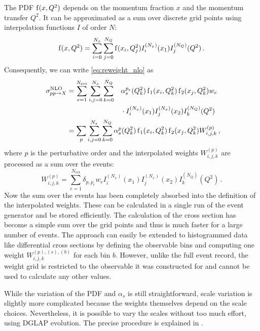 The PDF $\operatorname{f}(x,Q^2)$ depends on the momentum fraction $x$ and the momentum transfer $Q^2$.
It can be approximated as a sum over discrete grid points using interpolation functions $I$ of order $N$:
%
\begin{equation}
	\operatorname{f}(x,Q^2) = \sum_{i=0}^{N_x} \sum_{j=0}^{N_Q} \operatorname{f}(x_i,Q_j^2) I_i^{(N_x)}(x_1) I_j^{(N_Q)}(Q^2) \, .
\end{equation}
%
Consequently, we can write \cref{eq:reweight_nlo} as
%
\begin{alignat}{3}
  \sigma^\text{NLO}_{pp \rightarrow X}	&= \sum_{e=1}^{N_\text{evt}} \sum_{i,j=0}^{N_x} \sum_{k=0}^{N_Q} &&\alpha_s^{p_e}(Q_k^2) \pdf_1(x_i,Q_k^2) \pdf_2(x_j,Q_k^2) w_e \nonumber \\
  										&	&&\cdot I_i^{(N_x)}(x_1) I_j^{(N_x)}(x_2) I_k^{(N_Q)}(Q^2) \nonumber \\
  										&= \mathrlap{\sum_p \sum_{i,j=0}^{N_x} \sum_{k=0}^{N_Q} \alpha_s^p(Q_k^2) \pdf_1(x_i,Q_k^2) \pdf_2(x_j,Q_k^2) W_{i,j,k}^{(p)} \, ,}
\end{alignat}
%
where $p$ is the perturbative order and the interpolated weights $W_{i,j,k}^{(p)}$ are processed as a sum over the events:
\begin{equation}
	W_{i,j,k}^{(p)} = \sum_{e=1}^{N_\text{evt}} \delta_{p,p_e} w_e I_i^{(N_x)}(x_1) I_j^{(N_x)}(x_2) I_k^{(N_Q)}(Q^2) \, .
\end{equation}
%
Now the sum over the events has been completely absorbed into the definition of the interpolated weights.
These can be calculated in a single run of the event generator and be stored efficiently.
The calculation of the cross section has become a simple sum over the grid points and thus is much faster for a large number of events.
The approach can easily be extended to histogrammed data like differential cross sections by defining the observable bins and computing one weight $W_{i,j,k}^{(p),(s),(b)}$ for each bin $b$.
However, unlike the full event record, the weight grid is restricted to the observable it was constructed for and cannot be used to calculate any other values.

While the variation of the PDF and $\alpha_s$ is still straightforward, scale variation is slightly more complicated because the weights themselves depend on the scale choices.
Nevertheless, it is possible to vary the scales without too much effort, using DGLAP evolution.
The precise procedure is explained in \cite{applgrid2010}.
